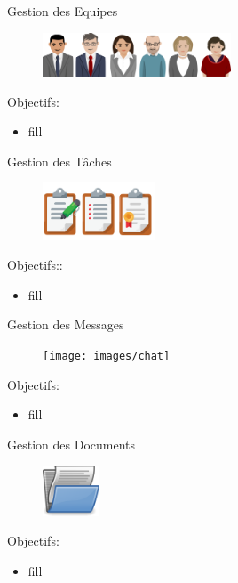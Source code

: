 \begin{frame}{Gestion des Equipes}
\begin{figure}[h!]
  \includegraphics[width=0.5\textwidth]{images/team}
\end{figure}
Objectifs:
  \begin{itemize}
\item fill
    \end{itemize}
\end{frame}

\begin{frame}{Gestion des Tâches}
\begin{figure}[h!]
  \includegraphics[width=0.3\textwidth]{images/tasks}
\end{figure}
Objectifs::
  \begin{itemize}
\item fill
    \end{itemize}
\end{frame}

\begin{frame}{Gestion des Messages}
\begin{figure}[h!]
  \texttt{[image: images/chat]}
\end{figure}
Objectifs:
  \begin{itemize}
\item fill
    \end{itemize}
\end{frame}

\begin{frame}{Gestion des Documents}
\begin{figure}[h!]
  \includegraphics[width=0.15\textwidth]{images/document-open-hi}
\end{figure}
Objectifs:
  \begin{itemize}
\item fill
    \end{itemize}
\end{frame}


